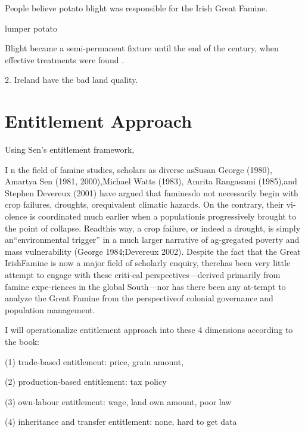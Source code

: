 People believe potato blight was responsible for the Irish Great Famine. 

lumper potato

Blight became a semi-permanent fixture until the end of the century, when effective treatments were found \citep{o1994economic}.

2. Ireland have the bad land quality.

\section{Entitlement Approach}

Using Sen's entitlement framework, \citep{fraser2003social}

I n the ﬁeld of famine studies, scholars as diverse asSusan George (1980), Amartya Sen (1981, 2000),Michael Watts (1983), Amrita Rangasami (1985),and Stephen Devereux (2001) have argued that faminesdo not necessarily begin with crop failures, droughts, orequivalent climatic hazards. On the contrary, their vi-olence is coordinated much earlier when a populationis progressively brought to the point of collapse. Readthis way, a crop failure, or indeed a drought, is simply an“environmental trigger” in a much larger narrative of ag-gregated poverty and mass vulnerability (George 1984;Devereux 2002). Despite the fact that the Great IrishFamine is now a major ﬁeld of scholarly enquiry, therehas been very little attempt to engage with these criti-cal perspectives—derived primarily from famine expe-riences in the global South—nor has there been any at-tempt to analyze the Great Famine from the perspectiveof colonial governance and population management. \citep{nally2008coming}


I will operationalize entitlement approach into these 4 dimensions according to the book:

(1) trade-based entitlement: price, grain amount, 

(2) production-based entitlement: tax policy

(3) own-labour entitlement: wage, land own amount, poor law

(4) inheritance and transfer entitlement: none, hard to get data







